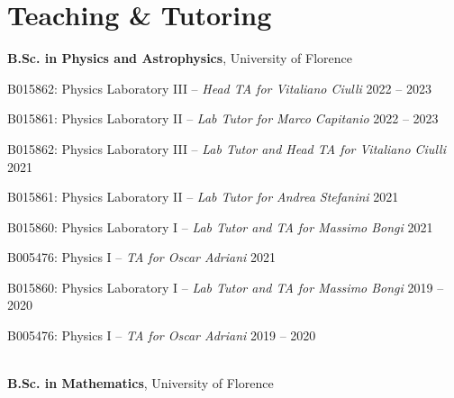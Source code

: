 \newcommand{\teaching}[2]
  {\normalsize \textbf{\color{hlcolor-0} #1}, {\color{hlcolor-1} #2}}
  
\newcommand{\teachclass}[3]
  {{\normalsize \color{maincolor} #1 --}
  {\small \color{maincolor} \emph{#2}} \hfill 
  {\normalsize \color{hlcolor-2} #3}}


\section*{Teaching \& Tutoring}
\begin{cvcontent}
  \teaching{B.Sc. in Physics and Astrophysics}{University of Florence}
  \\ [0.5mm]
  \begin{itemize*}[label=\textcolor{iconcolor}{\textbullet}]
    \item \teachclass{B015862: Physics Laboratory III}{Head TA for Vitaliano Ciulli}{2022 -- 2023}\\ [0.5mm]
    \item \teachclass{B015861: Physics Laboratory II}{Lab Tutor for Marco Capitanio}{2022 -- 2023}\\ [0.5mm]
    \item \teachclass{B015862: Physics Laboratory III}{Lab Tutor and Head TA for Vitaliano Ciulli}{2021}\\ [0.5mm]
    \item \teachclass{B015861: Physics Laboratory II}{Lab Tutor for Andrea Stefanini}{2021}\\ [0.5mm]
    \item \teachclass{B015860: Physics Laboratory I}{Lab Tutor and TA for Massimo Bongi}{2021}\\ [0.5mm]
    \item \teachclass{B005476: Physics I}{TA for Oscar Adriani}{2021}\\ [0.5mm]
    \item \teachclass{B015860: Physics Laboratory I}{Lab Tutor and TA for Massimo Bongi}{2019 -- 2020}\\ [0.5mm]
    \item \teachclass{B005476: Physics I}{TA for Oscar Adriani}{2019 -- 2020}
  \end{itemize*}
  \\ [3mm]
  \teaching{B.Sc. in Mathematics}{University of Florence}
  \\ [0.5mm]

\end{cvcontent}
